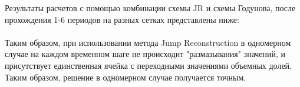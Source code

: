 \documentclass[12pt,a4paper]{article}
\begin{document}
Результаты расчетов с помощью комбинации схемы JR и схемы Годунова, после прохождения 1-6 периодов на разных сетках представлены ниже:
\\
\medskip
\\
Таким образом, при использовании метода Jump Reconstruction в одномерном случае на каждом временном шаге не происходит "размазывания" значений, и присутствует единственная ячейка с переходными значениями объемных долей. Таким образом, решение в одномерном случае получается точным. 
\end{document}
